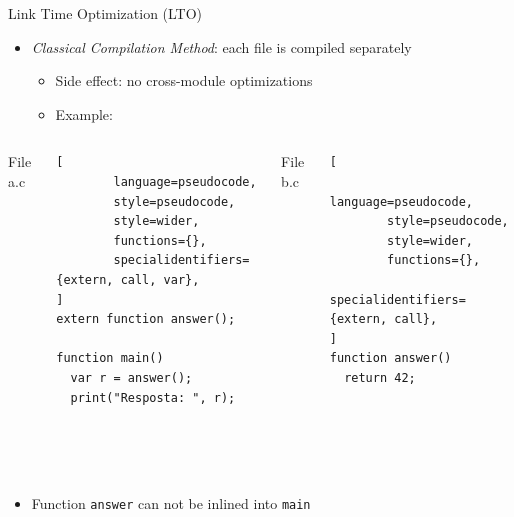\begin{frame}[fragile]{Link Time Optimization (LTO)}
\begin{itemize}
    \item \textit{Classical Compilation Method}: each file is compiled separately
    \begin{itemize}
        \item Side effect: no cross-module optimizations
        \item Example:
    \end{itemize}
\end{itemize}

  \begin{columns}[c] %

    \begin{center}
        File a.c
    \end{center}

\begin{lstlisting}[
        language=pseudocode,
        style=pseudocode,
        style=wider,
        functions={},
        specialidentifiers={extern, call, var},
]
extern function answer();

function main()
  var r = answer();
  print("Resposta: ", r);
\end{lstlisting}

    \begin{center}
        File b.c
    \end{center}

\begin{lstlisting}[
        language=pseudocode,
        style=pseudocode,
        style=wider,
        functions={},
        specialidentifiers={extern, call},
]
function answer()
  return 42;





\end{lstlisting}

  \end{columns}

\begin{itemize}
    \item Function \texttt{answer} can not be inlined into \texttt{main}
\end{itemize}

\end{frame}


